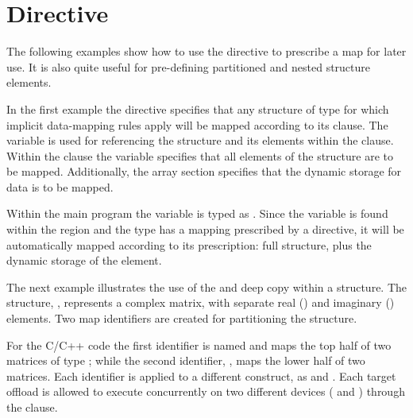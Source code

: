 \pagebreak
\section{ Directive}
\label{sec:declare_mapper}

The following examples show how to use the 
directive to prescribe a map for later use.
It is also quite useful for pre-defining partitioned and nested 
structure elements.

In the first example the  directive specifies 
that any structure of type  for which implicit data-mapping
rules apply will be mapped according to its  clause.
The variable  is used for referencing the structure and its 
elements within the  clause. 
Within the  clause the  variable specifies that all
elements of the structure are to be mapped.  Additionally, the
array section  specifies that the dynamic 
storage for data is to be mapped. 

Within the main program the  variable is typed as .
Since the variable is found within the  region and the type has a mapping prescribed by
a  directive, it will be automatically mapped according to its prescription: 
full structure, plus the dynamic storage of the  element. 




{}
The next example illustrates the use of the  and deep copy within a structure. 
The structure, ,  represents a complex matrix, 
with separate real () and imaginary () elements.
Two map identifiers are created for partitioning the  structure.

For the C/C++ code the first identifier is named  and maps the top half of
two matrices of type ; while the second identifier, ,
maps the lower half of two matrices. 
Each identifier is applied to a different  construct,
as   
and .
Each target offload is allowed to execute concurrently on two different devices 
( and ) through the  clause.


